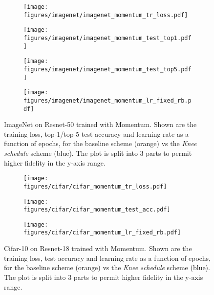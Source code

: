 \documentclass[twoside,11pt]{article}
\newcommand{\lrschedule}{\textit{Knee schedule}}
\begin{document}
\begin{figure}[h]
    \centering
    \begin{subfigure}[t]{0.88\textwidth}
        \centering
        \texttt{[image: figures/imagenet/imagenet\_momentum\_tr\_loss.pdf]}
\label{fig:imagenet_momentum_tr_loss}
    \end{subfigure}
    \begin{subfigure}[t]{0.88\textwidth}
        \centering
        \texttt{[image: figures/imagenet/imagenet\_momentum\_test\_top1.pdf]}
\label{fig:imagenet_momentum_test_top1_acc}
    \end{subfigure}
    \begin{subfigure}[t]{0.88\textwidth}
        \centering
        \texttt{[image: figures/imagenet/imagenet\_momentum\_test\_top5.pdf]}
\label{fig:imagenet_momentum_test_top5_acc}
    \end{subfigure}
    \begin{subfigure}[t]{0.88\textwidth}
        \centering
        \texttt{[image: figures/imagenet/imagenet\_momentum\_lr\_fixed\_rb.pdf]}
\label{fig:imagenet_momentum_lr}
    \end{subfigure}
\caption{ImageNet on Resnet-50 trained with Momentum. Shown are the training loss, top-1/top-5 test accuracy and learning rate as a function of epochs, for the baseline scheme (orange) vs the \lrschedule{} scheme (blue). The plot is split into 3 parts to permit higher fidelity in the y-axis range.}
\label{fig:imagenet_momentum_result}
\end{figure}



\begin{figure}[h]
    \begin{subfigure}[t]{\textwidth}
        \centering
        \texttt{[image: figures/cifar/cifar\_momentum\_tr\_loss.pdf]}
\label{fig:cifar_momentum_tr_loss}
    \end{subfigure}
    \begin{subfigure}[t]{\textwidth}
        \centering
        \texttt{[image: figures/cifar/cifar\_momentum\_test\_acc.pdf]}
\label{fig:cifar_momentum_test_acc}
    \end{subfigure}
    \begin{subfigure}[t]{\textwidth}
        \centering
        \texttt{[image: figures/cifar/cifar\_momentum\_lr\_fixed\_rb.pdf]}
\label{fig:cifar_momentum_lr}
    \end{subfigure}
\caption{Cifar-10 on Resnet-18 trained with Momentum. Shown are the training loss, test accuracy and learning rate as a function of epochs, for the baseline scheme (orange) vs the \lrschedule{} scheme (blue). The plot is split into 3 parts to permit higher fidelity in the y-axis range.}
\label{fig:cifar_momentum_result}
\end{figure}
\end{document}

